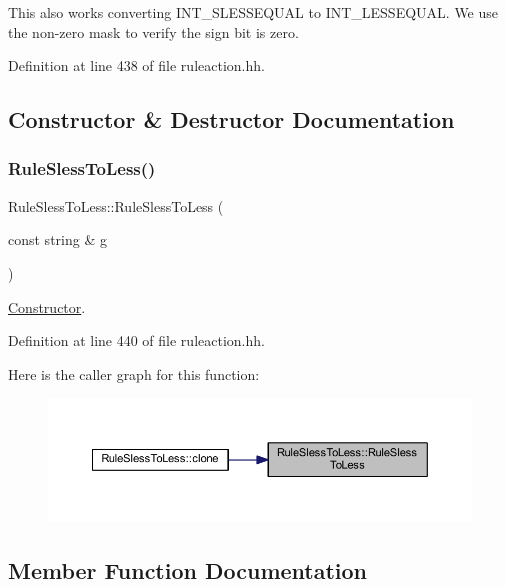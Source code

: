 This also works converting I\+N\+T\+\_\+\+S\+L\+E\+S\+S\+E\+Q\+U\+AL to I\+N\+T\+\_\+\+L\+E\+S\+S\+E\+Q\+U\+AL. We use the non-\/zero mask to verify the sign bit is zero. 

Definition at line 438 of file ruleaction.\+hh.



\subsection{Constructor \& Destructor Documentation}
\mbox{\label{class_rule_sless_to_less_a95adf7839326388742dbfce8f4eb59d7}} 
\subsubsection{\texorpdfstring{RuleSlessToLess()}{RuleSlessToLess()}}
{\footnotesize\ttfamily Rule\+Sless\+To\+Less\+::\+Rule\+Sless\+To\+Less (\begin{DoxyParamCaption}\item[{const string \&}]{g }\end{DoxyParamCaption})\hspace{0.3cm}{\ttfamily [inline]}}



\mbox{\hyperlink{class_constructor}{Constructor}}. 



Definition at line 440 of file ruleaction.\+hh.

Here is the caller graph for this function\+:
\nopagebreak
\begin{figure}[H]
\begin{center}
\leavevmode
\includegraphics[width=350pt]{class_rule_sless_to_less_a95adf7839326388742dbfce8f4eb59d7_icgraph}
\end{center}
\end{figure}


\subsection{Member Function Documentation}
\mbox{\label{class_rule_sless_to_less_add6def135ebd895fd30990297c3dd280}} 
